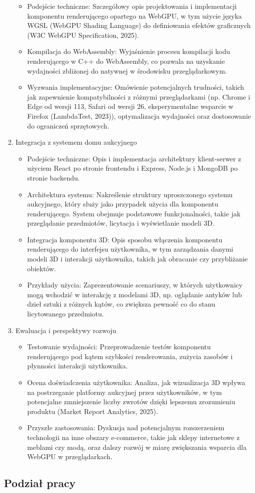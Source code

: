 \begin{enumerate}
\begin{itemize}
      \item Podejście techniczne: Szczegółowy opis projektowania i implementacji komponentu renderującego opartego na WebGPU, w tym użycie języka WGSL (WebGPU Shading Language) do definiowania efektów graficznych (W3C WebGPU Specification, 2025).
      \item Kompilacja do WebAssembly: Wyjaśnienie procesu kompilacji kodu renderującego w C++ do WebAssembly, co pozwala na uzyskanie wydajności zbliżonej do natywnej w środowisku przeglądarkowym.
      \item Wyzwania implementacyjne: Omówienie potencjalnych trudności, takich jak zapewnienie kompatybilności z różnymi przeglądarkami (np. Chrome i Edge od wersji 113, Safari od wersji 26, eksperymentalne wsparcie w Firefox (LambdaTest, 2023)), optymalizacja wydajności oraz dostosowanie do ograniczeń sprzętowych.
    \end{itemize}
  \item Integracja z systemem domu aukcyjnego
    \begin{itemize}
      \item Podejście techniczne: Opis i implementacja architektury klient-serwer z użyciem React po stronie frontendu i Express, Node.js i MongoDB po stronie backendu.
      \item Architektura systemu: Nakreślenie struktury uproszczonego systemu aukcyjnego, który służy jako przypadek użycia dla komponentu renderującego. System obejmuje podstawowe funkcjonalności, takie jak przeglądanie przedmiotów, licytacja i wyświetlanie modeli 3D.
      \item Integracja komponentu 3D: Opis sposobu włączenia komponentu renderującego do interfejsu użytkownika, w tym zarządzania danymi modeli 3D i interakcji użytkownika, takich jak obracanie czy przybliżanie obiektów.
      \item Przykłady użycia: Zaprezentowanie scenariuszy, w których użytkownicy mogą wchodzić w interakcję z modelami 3D, np. oglądanie antyków lub dzieł sztuki z różnych kątów, co zwiększa pewność co do stanu licytowanego przedmiotu.
    \end{itemize}
  \item Ewaluacja i perspektywy rozwoju
    \begin{itemize}
      \item Testowanie wydajności: Przeprowadzenie testów komponentu renderującego pod kątem szybkości renderowania, zużycia zasobów i płynności interakcji użytkownika.
      \item Ocena doświadczenia użytkownika: Analiza, jak wizualizacja 3D wpływa na postrzeganie platformy aukcyjnej przez użytkowników, w tym potencjalne zmniejszenie liczby zwrotów dzięki lepszemu zrozumieniu produktu (Market Report Analytics, 2025).
      \item Przyszłe zastosowania: Dyskusja nad potencjalnym rozszerzeniem technologii na inne obszary e-commerce, takie jak sklepy internetowe z meblami czy modą, oraz dalszy rozwój w miarę zwiększania wsparcia dla WebGPU w przeglądarkach.
    \end{itemize}
\end{enumerate}

\subsection{Podział pracy}

\newpage